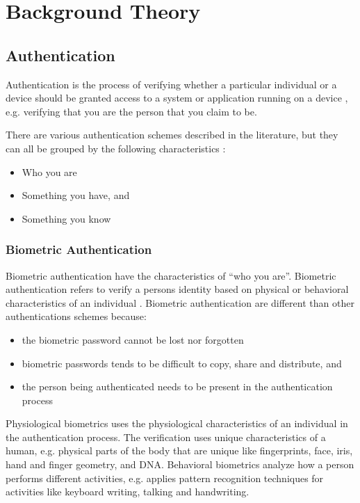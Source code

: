 \chapter{Background Theory}

  \section{Authentication}

  Authentication is the process of verifying whether a particular individual or a device should be granted access to a system or application running on a device \cite{IPAS}, e.g. verifying that you are the person that you claim to be.

  There are various authentication schemes described in the literature, but they can all be grouped by the following characteristics \cite{IPAS}:

    \begin{itemize}
      \item Who you are
      \item Something you have, and
      \item Something you know
    \end{itemize}

    \subsection{Biometric Authentication}
    Biometric authentication have the characteristics of ``who you are''. Biometric authentication refers to verify a persons identity based on physical or behavioral characteristics of an individual \cite{biometrics, biometrics2}. Biometric authentication are different than other authentications schemes because:

      \begin{itemize}
        \item the biometric password cannot be lost nor forgotten
        \item biometric passwords tends to be difficult to copy, share and distribute, and 
        \item the person being authenticated needs to be present in the authentication process
      \end{itemize} 

     Physiological biometrics uses the physiological characteristics of an individual in the authentication process. The verification uses unique characteristics of a human, e.g. physical parts of the body that are unique like fingerprints, face, iris, hand and finger geometry, and DNA. Behavioral biometrics analyze how a person performs different activities, e.g. applies pattern recognition techniques for activities like keyboard writing, talking and handwriting.

